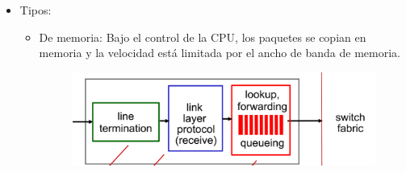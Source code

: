 \documentclass[12pt, twoside, openright]{report} %
\begin{document}
\begin{itemize}
	\item Tipos:

	      \begin{itemize}
		      \item De memoria: Bajo el control de la CPU, los paquetes se copian en
		            memoria y la velocidad está limitada por el ancho de banda de
		            memoria.
		            \begin{figure}[H]
			            {\includegraphics[scale=.15]{Untitled 23.png}}
		            \end{figure}


\end{itemize}
\end{itemize}
\end{document}
